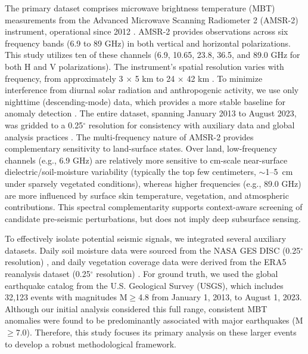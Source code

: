 \documentclass[preprint,review,12pt,authoryear]{elsarticle}
\begin{document}
The primary dataset comprises microwave brightness temperature (MBT) measurements from the Advanced Microwave Scanning Radiometer 2 (AMSR-2) instrument, operational since 2012 \citep{kasaharaStatusAMSR22012}. AMSR-2 provides observations across six frequency bands (6.9 to 89 GHz) in both vertical and horizontal polarizations. This study utilizes ten of these channels (6.9, 10.65, 23.8, 36.5, and 89.0 GHz for both H and V polarizations). The instrument's spatial resolution varies with frequency, from approximately 3 $\times$ 5 km to 24 $\times$ 42 km \citep{kachiStatusGCOMW1AMSR22008}. To minimize interference from diurnal solar radiation and anthropogenic activity, we use only nighttime (descending-mode) data, which provides a more stable baseline for anomaly detection \citep{maedaDiscriminationLocalFaint2008}. The entire dataset, spanning January 2013 to August 2023, was gridded to a 0.25$^{\circ}$ resolution for consistency with auxiliary data and global analysis practices \citep{njokuRetrievalLandSurface1999,wuIdentifyingSeismicAnomalies2024}. The multi-frequency nature of AMSR-2 provides complementary sensitivity to land-surface states. Over land, low-frequency channels (e.g., 6.9 GHz) are relatively more sensitive to cm-scale near-surface dielectric/soil-moisture variability (typically the top few centimeters, $\sim$1--5~cm under sparsely vegetated conditions), whereas higher frequencies (e.g., 89.0 GHz) are more influenced by surface skin temperature, vegetation, and atmospheric contributions. This spectral complementarity supports context-aware screening of candidate pre-seismic perturbations, but does not imply deep subsurface sensing.

To effectively isolate potential seismic signals, we integrated several auxiliary datasets. Daily soil moisture data were sourced from the NASA GES DISC (0.25$^{\circ}$ resolution) \citep{fangGlobalLandData2009}, and daily vegetation coverage data were derived from the ERA5 reanalysis dataset (0.25$^{\circ}$ resolution) \citep{hersbachERA5GlobalReanalysis2020,munoz-sabaterERA5landStateoftheartGlobal2021}. For ground truth, we used the global earthquake catalog from the U.S. Geological Survey (USGS), which includes 32,123 events with magnitudes M$\ge$4.8 from January 1, 2013, to August 1, 2023. Although our initial analysis considered this full range, consistent MBT anomalies were found to be predominantly associated with major earthquakes (M$\ge$7.0). Therefore, this study focuses its primary analysis on these larger events to develop a robust methodological framework.
\end{document}
